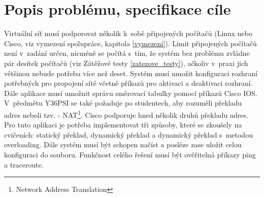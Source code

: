 \chapter{Popis problému, specifikace cíle}


Virtuální síť musí podporovat několik k~sobě připojených počítačů (Linux nebo Cisco, viz vymezení spolupráce, kapitola \ref{vymezeni}). Limit připojených počítačů není v~zadání určen, nicméně se počítá s~tím, že systém bez problému zvládne pár desítek počítačů (viz Zátěžové testy \ref{zatezove_testy}), ačkoliv v~praxi jich většinou nebude potřeba více než deset. Systém musí umožit konfiguraci rozhraní potřebných pro propojení sítě včetně příkazů pro aktivaci a deaktivaci rozhraní. Dále aplikace musí umožnit správu směrovací tabulky pomocí příkazů Cisco IOS. V~předmětu Y36PSI se také požaduje po studentech, aby rozuměli překladu adres neboli tzv.  - NAT\footnote{Network Address Translation}. Cisco podporuje hned několik druhů překladu adres. Pro tuto aplikaci je potřeba implementovat tři způsoby, které se zkoušely na cvičeních: statický překlad, dynamický překlad a dynamický překlad s~metodou overloading. Dále systém musí být schopen načíst a posléze zase uložit celou konfiguraci do souboru. Funkčnost celého řešení musí být ověřitelná příkazy ping a traceroute.

